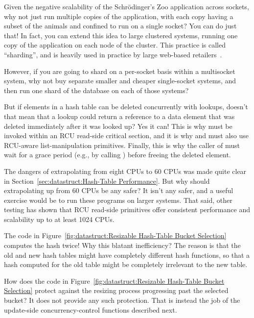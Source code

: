 \QuickQ{}
	Given the negative scalability of the Schr\"odinger's
	Zoo application across sockets, why not just run multiple
	copies of the application, with each copy having a subset
	of the animals and confined to run on a single socket?
\QuickA{}
	You can do just that!
	In fact, you can extend this idea to large clustered systems,
	running one copy of the application on each node of the cluster.
	This practice is called ``sharding'', and is heavily used in
	practice by large web-based
	retailers~\cite{DeCandia:2007:DAH:1323293.1294281}.

	However, if you are going to shard on a per-socket basis within
	a multisocket system, why not buy separate smaller and cheaper
	single-socket systems, and then run one shard of the database
	on each of those systems?

\QuickQ{}
	But if elements in a hash table can be deleted concurrently
	with lookups, doesn't that mean that a lookup could return
	a reference to a data element that was deleted immediately
	after it was looked up?
\QuickA{}
	Yes it can!
	This is why  must be invoked within an
	RCU read-side critical section, and it is why
	 and  must also use
	RCU-aware list-manipulation primitives.
	Finally, this is why the caller of  must
	wait for a grace period (e.g., by calling )
	before freeing the deleted element.

\QuickQ{}
	The dangers of extrapolating from eight CPUs to 60 CPUs was
	made quite clear in
	Section~\ref{sec:datastruct:Hash-Table Performance}.
	But why should extrapolating up from 60 CPUs be any safer?
\QuickA{}
	It isn't any safer, and a useful exercise would be to run these
	programs on larger systems.
	That said, other testing has shown that RCU read-side primitives
	offer consistent performance and scalability up to at least 1024 CPUs.

\QuickQ{}
	The code in
	Figure~\ref{fig:datastruct:Resizable Hash-Table Bucket Selection}
	computes the hash twice!
	Why this blatant inefficiency?
\QuickA{}
	The reason is that the old and new hash tables might have
	completely different hash functions, so that a hash computed
	for the old table might be completely irrelevant to the
	new table.

\QuickQ{}
	How does the code in
	Figure~\ref{fig:datastruct:Resizable Hash-Table Bucket Selection}
	protect against the resizing process progressing past the
	selected bucket?
\QuickA{}
	It does not provide any such protection.
	That is instead the job of the update-side concurrency-control
	functions described next.

